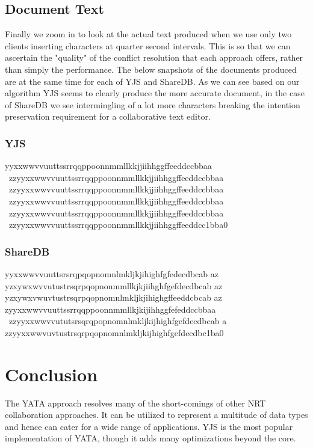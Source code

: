 \documentclass[12pt]{article}
\begin{document}
  \subsection{Document Text}
  Finally we zoom in to look at the actual text produced when we use only two clients inserting characters at quarter second intervals.
  This is so that we can ascertain the "quality" of the conflict resolution that each approach offers, rather than simply the performance.
  The below snapshots of the documents produced are at the same time for each of YJS and ShareDB.
  As we can see based on our algorithm YJS seems to clearly produce the more accurate document, in the case of ShareDB we see intermingling 
  of a lot more characters breaking the intention preservation requirement for a collaborative text editor.
  
  \subsubsection{YJS}
  yyxxwwvvuuttssrrqqppoonnmmllkkjjiihhggffeeddccbbaa \ zzyyxxwwvvuuttssrrqqppoonnmmllkkjjiihhggffeeddccbbaa \ zzyyxxwwvvuuttssrrqqppoonnmmllkkjjiihhggffeeddccbbaa \ zzyyxxwwvvuuttssrrqqppoonnmmllkkjjiihhggffeeddccbbaa \ zzyyxxwwvvuuttssrrqqppoonnmmllkkjjiihhggffeeddccbbaa \ zzyyxxwwvvuuttssrrqqppoonnmmllkkjjiihhggffeeddcc1bba0

  \subsubsection{ShareDB}
  yyxxwwvvuuttsrsrqpqopnomnlmkljkjihighfgfedecdbcab az yzxywxwvvutustrsqrpqopnonmmllkjkjiihghfgefdecdbcab az yzxywxvwuvtustrsqrpqopnomnlmkljkjihighgffeeddcbcab az zyyxxwwvvuuttssrrqqppoonnmmllkjkijihhggfefeddccbbaa \ zzyyxxwwvvututsrsqrqpopnomnlmkljkijhighfgefdecdbcab a zzyyxxwwvuvtustrsqrpqopnomnlmkljkijhighfgefdecdbc1ba0

  \section{Conclusion}
  The YATA approach resolves many of the short-comings of other NRT collaboration approaches.
  It can be utilized to represent a multitude of data types and hence can cater for a wide range of applications.
  YJS is the most popular implementation of YATA, though it adds many optimizations beyond the core.
\end{document}
